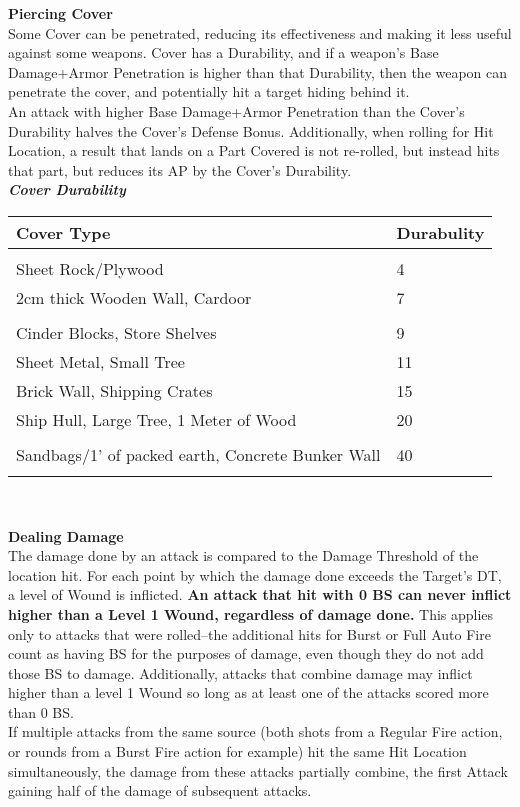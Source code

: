\documentclass[a4paper, twocolumn, openany]{book}
\begin{document}
{{\bfseries Piercing Cover\\}
Some Cover can be penetrated, reducing its effectiveness and making it less useful against
some weapons. Cover has a Durability, and if a weapon’s Base Damage+Armor Penetration is
higher than that Durability, then the weapon can penetrate the cover, and potentially hit a target
hiding behind it.\\
An attack with higher Base Damage+Armor Penetration than the Cover’s Durability halves the
Cover’s Defense Bonus. Additionally, when rolling for Hit Location, a result that lands on a Part
Covered is not re-rolled, but instead hits that part, but reduces its AP by the Cover’s Durability.\\

{\bfseries\slshape Cover Durability\\}

{\center
\begin{tabular}{p{5cm}l}
Cover Type & Durabulity \\ \hline \\
Sheet Rock/Plywood & 4 \\
2cm thick Wooden Wall, Cardoor & 7 \\ \\
Cinder Blocks, Store Shelves & 9 \\
Sheet Metal, Small Tree & 11 \\
Brick Wall, Shipping Crates & 15 \\
Ship Hull, Large Tree, 1 Meter of Wood & 20 \\ \\
Sandbags/1’ of packed earth, Concrete Bunker Wall & 40 \\
\\ \hline
\end{tabular}\\[\baselineskip] }

{\bfseries Dealing Damage\\}
The damage done by an attack is compared to the Damage Threshold of the location hit. For
each point by which the damage done exceeds the Target’s DT, a level of Wound is inflicted.
{\bfseries An attack that hit with 0 BS can never inflict higher than a Level 1 Wound, regardless of
 damage done.} This applies only to attacks that were rolled--the additional hits for Burst or Full
Auto Fire count as having BS for the purposes of damage, even though they do not add those
BS to damage. Additionally, attacks that combine damage may inflict higher than a level 1
Wound so long as at least one of the attacks scored more than 0 BS.\\
If multiple attacks from the same source (both shots from a Regular Fire action, or rounds from
a Burst Fire action for example) hit the same Hit Location simultaneously, the damage from
these attacks partially combine, the first Attack gaining half of the damage of subsequent
attacks.\\

}
\end{document}
